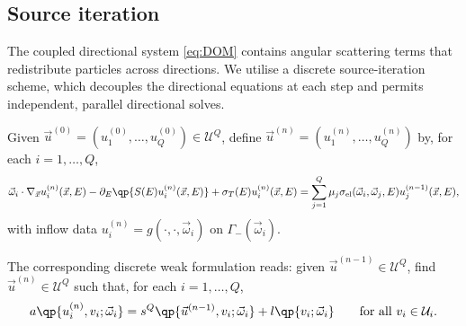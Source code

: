 \documentclass[final]{amsart}
\begin{document}
\subsection{Source iteration}
\label{subsec:sourceiteration}

The coupled directional system \eqref{eq:DOM} contains angular
scattering terms that redistribute particles across directions. We
utilise a discrete source-iteration scheme, which decouples the
directional equations at each step and permits independent, parallel
directional solves.

Given $\vec{u}^{(0)}=(u^{(0)}_1,\dots,u^{(0)}_Q)\in\mathcal{U}^Q$, define
$\vec{u}^{(n)}=(u^{(n)}_1,\dots,u^{(n)}_Q)$ by, for each $i=1,\dots,Q$,
\begin{equation}
  \label{eq:SI-strong-discrete}
  \vec{\omega}_i\cdot\nabla_{\vec x} u_i^{(n)}(\vec{x},E)
  -
  \partial_E\qp{S(E)u_i^{(n)}(\vec{x},E)}
  +
  \sigma_T(E)u_i^{(n)}(\vec{x},E)
  =
  \sum_{j=1}^Q \mu_j 
  \sigma_{\mathrm{el}}(\vec{\omega}_i,\vec{\omega}_j,E) 
  u_j^{(n-1)}(\vec{x},E),
\end{equation}
with inflow data $u_i^{(n)}=g(\cdot,\cdot,\vec{\omega}_i)$ on
$\Gamma_-(\vec{\omega}_i)$.

The corresponding discrete weak formulation reads: given
$\vec{u}^{(n-1)}\in\mathcal{U}^Q$, find
$\vec{u}^{(n)}\in\mathcal{U}^Q$ such that, for each $i=1,\dots,Q$,
\begin{equation}
  \label{eq:SI-weak-discrete}
  a\qp{u_i^{(n)},v_i;\vec{\omega}_i}
  =
  s^Q\qp{\vec{u}^{(n-1)},v_i;\vec{\omega}_i}
  +
  l\qp{v_i;\vec{\omega}_i}
  \qquad \text{for all } v_i\in\mathcal{U}_i.
\end{equation}
\end{document}
